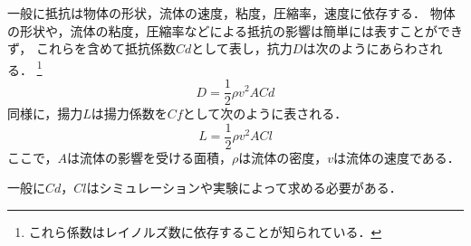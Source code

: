 一般に抵抗は物体の形状，流体の速度，粘度，圧縮率，速度に依存する．
物体の形状や，流体の粘度，圧縮率などによる抵抗の影響は簡単には表すことができず，
これらを含めて抵抗係数$Cd$として表し，抗力$D$は次のようにあらわされる．
\footnote{
    これら係数はレイノルズ数に依存することが知られている．
}
\begin{equation}
    D = \frac{1}{2} \rho v^2 A Cd
\end{equation}
同様に，揚力$L$は揚力係数を$Cf$として次のように表される．
\begin{equation}
    L = \frac{1}{2} \rho v^2 A Cl
\end{equation}
ここで，$A$は流体の影響を受ける面積，$\rho$は流体の密度，$v$は流体の速度である．

一般に$Cd$，$Cl$はシミュレーションや実験によって求める必要がある．